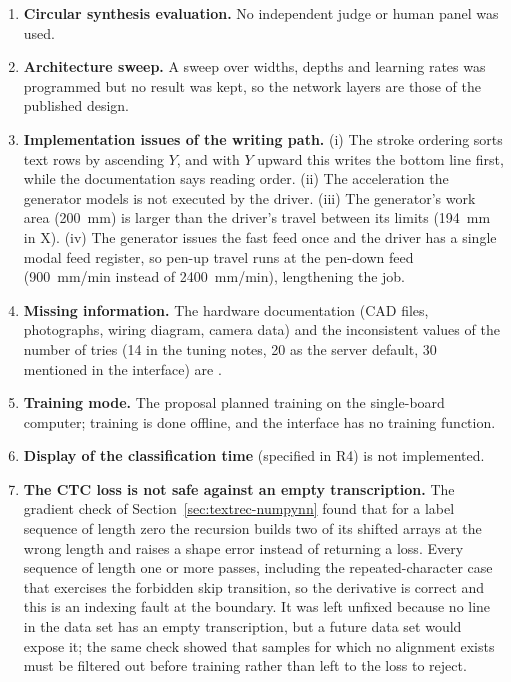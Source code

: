 \begin{enumerate}
          \item \textbf{Circular synthesis evaluation.} No independent judge or human panel was used.
          \item \textbf{Architecture sweep.} A sweep over widths, depths and learning rates was programmed but no result was kept, so the network layers are those of the published design.
          \item \textbf{Implementation issues of the writing path.} (i) The stroke ordering sorts text rows by ascending $Y$, and with $Y$ upward this writes the bottom line first, while the documentation says reading order. (ii) The acceleration the generator models is not executed by the driver. (iii) The generator's work area (200~mm) is larger than the driver's travel between its limits (194~mm in X). (iv) The generator issues the fast feed once and the driver has a single modal feed register, so pen-up travel runs at the pen-down feed (900~mm/min instead of 2400~mm/min), lengthening the job.
          \item \textbf{Missing information.} The hardware documentation (CAD files, photographs, wiring diagram, camera data) and the inconsistent values of the number of tries (14 in the tuning notes, 20 as the server default, 30 mentioned in the interface) are .
          \item \textbf{Training mode.} The proposal planned training on the single-board computer; training is done offline, and the interface has no training function.
          \item \textbf{Display of the classification time} (specified in R4) is not implemented.
          \item \textbf{The CTC loss is not safe against an empty transcription.} The gradient check of Section~\ref{sec:textrec-numpynn} found that for a label sequence of length zero the recursion builds two of its shifted arrays at the wrong length and raises a shape error instead of returning a loss.
          Every sequence of length one or more passes, including the repeated-character case that exercises the forbidden skip transition, so the derivative is correct and this is an indexing fault at the boundary.
          It was left unfixed because no line in the data set has an empty transcription, but a future data set would expose it; the same check showed that samples for which no alignment exists must be filtered out before training rather than left to the loss to reject.
        \end{enumerate}

